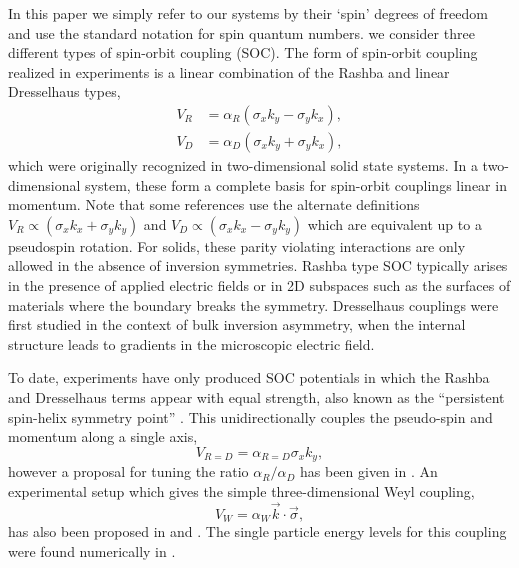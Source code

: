 \documentclass[%
 preprint,
 amsmath,amssymb,
 aps,
]{revtex4-1}
\begin{document}
In this paper we simply refer to our systems by their `spin' degrees of freedom and use the standard notation for spin quantum numbers. we consider three different types of spin-orbit coupling (SOC). The form of spin-orbit coupling realized in experiments is a linear combination of the Rashba \cite{0022-3719-17-33-015} and linear Dresselhaus \cite{PhysRev.100.580} types,
\begin{align}
V_{R}&=\alpha_R (\sigma_x k_y-\sigma_y k_x) \label{eq:Rashba},\\
V_{D}&=\alpha_D (\sigma_x k_y+\sigma_y k_x) \label{eq:Dresselhaus},
\end{align} 
which were originally recognized in two-dimensional solid state systems. In a two-dimensional system, these form a complete basis for spin-orbit couplings linear in momentum. Note that some references use the alternate definitions $V_R\propto  (\sigma_x k_x+\sigma_y k_y) $ and $V_D\propto  (\sigma_x k_x-\sigma_y k_y) $ which are equivalent up to a pseudospin rotation.  For solids, these parity violating interactions are only allowed in the absence of inversion symmetries. Rashba type SOC typically arises in the presence of applied electric fields or in 2D subspaces such as the surfaces of materials where the boundary breaks the symmetry. Dresselhaus couplings were first studied in the context of bulk inversion asymmetry, when the internal structure leads to gradients in the microscopic electric field. 


To date, experiments have only produced SOC potentials in which the Rashba and Dresselhaus terms appear with equal strength, also known as the ``persistent spin-helix symmetry point'' \cite{PhysRevLett.97.236601}. This unidirectionally couples the pseudo-spin and momentum along a single axis,
\begin{equation}
\label{eq:R=D}
V_{R=D}=\alpha_{R=D}\sigma_x k_y,
\end{equation} 
however a proposal for tuning the ratio $\alpha_R/\alpha_D$ has been given in \cite{PhysRevA.84.025602}.  An experimental setup which gives the simple three-dimensional Weyl coupling,
\begin{equation}\label{eq:Weyl}
V_{W}=\alpha_W \vec{k}\cdot\vec{\sigma},
\end{equation}
has also been proposed in \cite{PhysRevLett.108.235301} and \cite{PhysRevLett.111.125301}. The single particle energy levels for this coupling were found numerically in \cite{0953-4075-46-13-134003}. 
\end{document}
